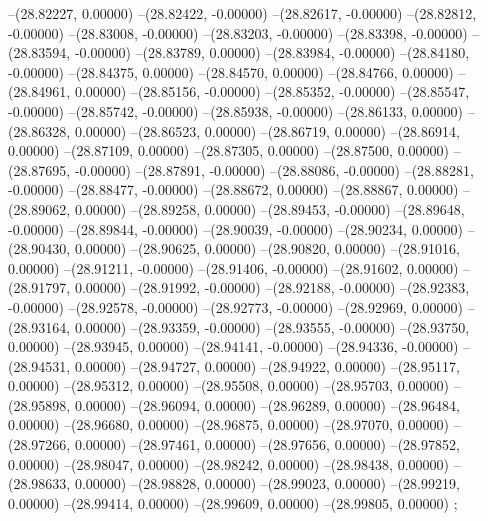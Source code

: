 --(28.82227, 0.00000)
--(28.82422, -0.00000)
--(28.82617, -0.00000)
--(28.82812, -0.00000)
--(28.83008, -0.00000)
--(28.83203, -0.00000)
--(28.83398, -0.00000)
--(28.83594, -0.00000)
--(28.83789, 0.00000)
--(28.83984, -0.00000)
--(28.84180, -0.00000)
--(28.84375, 0.00000)
--(28.84570, 0.00000)
--(28.84766, 0.00000)
--(28.84961, 0.00000)
--(28.85156, -0.00000)
--(28.85352, -0.00000)
--(28.85547, -0.00000)
--(28.85742, -0.00000)
--(28.85938, -0.00000)
--(28.86133, 0.00000)
--(28.86328, 0.00000)
--(28.86523, 0.00000)
--(28.86719, 0.00000)
--(28.86914, 0.00000)
--(28.87109, 0.00000)
--(28.87305, 0.00000)
--(28.87500, 0.00000)
--(28.87695, -0.00000)
--(28.87891, -0.00000)
--(28.88086, -0.00000)
--(28.88281, -0.00000)
--(28.88477, -0.00000)
--(28.88672, 0.00000)
--(28.88867, 0.00000)
--(28.89062, 0.00000)
--(28.89258, 0.00000)
--(28.89453, -0.00000)
--(28.89648, -0.00000)
--(28.89844, -0.00000)
--(28.90039, -0.00000)
--(28.90234, 0.00000)
--(28.90430, 0.00000)
--(28.90625, 0.00000)
--(28.90820, 0.00000)
--(28.91016, 0.00000)
--(28.91211, -0.00000)
--(28.91406, -0.00000)
--(28.91602, 0.00000)
--(28.91797, 0.00000)
--(28.91992, -0.00000)
--(28.92188, -0.00000)
--(28.92383, -0.00000)
--(28.92578, -0.00000)
--(28.92773, -0.00000)
--(28.92969, 0.00000)
--(28.93164, 0.00000)
--(28.93359, -0.00000)
--(28.93555, -0.00000)
--(28.93750, 0.00000)
--(28.93945, 0.00000)
--(28.94141, -0.00000)
--(28.94336, -0.00000)
--(28.94531, 0.00000)
--(28.94727, 0.00000)
--(28.94922, 0.00000)
--(28.95117, 0.00000)
--(28.95312, 0.00000)
--(28.95508, 0.00000)
--(28.95703, 0.00000)
--(28.95898, 0.00000)
--(28.96094, 0.00000)
--(28.96289, 0.00000)
--(28.96484, 0.00000)
--(28.96680, 0.00000)
--(28.96875, 0.00000)
--(28.97070, 0.00000)
--(28.97266, 0.00000)
--(28.97461, 0.00000)
--(28.97656, 0.00000)
--(28.97852, 0.00000)
--(28.98047, 0.00000)
--(28.98242, 0.00000)
--(28.98438, 0.00000)
--(28.98633, 0.00000)
--(28.98828, 0.00000)
--(28.99023, 0.00000)
--(28.99219, 0.00000)
--(28.99414, 0.00000)
--(28.99609, 0.00000)
--(28.99805, 0.00000)
;
